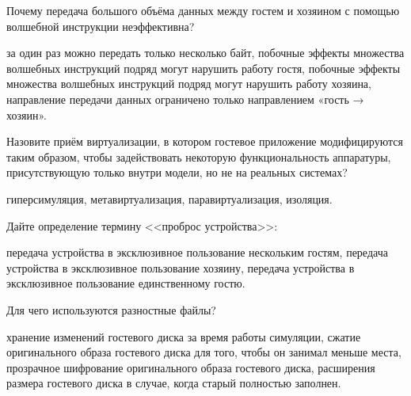 \begin{questions}

\question[3] Почему передача большого объёма данных между гостем и хозяином с помощью волшебной инструкции неэффективна?
\begin{choices}
\correctchoice за один раз можно передать только несколько байт,
\choice побочные эффекты множества волшебных инструкций подряд могут нарушить работу гостя,
\choice побочные эффекты множества волшебных инструкций подряд могут нарушить работу хозяина,
\choice направление передачи данных ограничено только направлением «гость → хозяин».
\end{choices}

\question[3] Назовите приём виртуализации, в котором гостевое приложение модифицируются таким образом, чтобы задействовать некоторую функциональность аппаратуры, присутствующую только внутри модели, но не на реальных системах?
\begin{choices}
\choice гиперсимуляция,
\choice метавиртуализация,
\correctchoice  паравиртуализация,
\choice изоляция.
\end{choices}

\question[3] Дайте определение термину <<проброс устройства>>:
\begin{choices}
\choice передача устройства в эксклюзивное пользование нескольким гостям,
\choice передача устройства в эксклюзивное пользование хозяину,
\correctchoice передача устройства в эксклюзивное пользование единственному гостю.
\end{choices}

\question[3] Для чего используются разностные файлы?
\begin{choices}
\correctchoice хранение изменений гостевого диска за время работы симуляции,
\choice сжатие оригинального образа гостевого диска для того, чтобы он занимал меньше места,
\choice прозрачное шифрование оригинального образа гостевого диска,
\choice расширения размера гостевого диска в случае, когда старый полностью заполнен.
\end{choices}

\end{questions}

